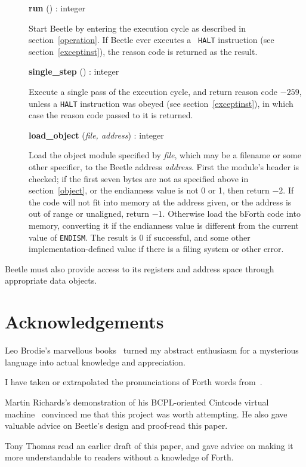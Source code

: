 \documentclass{article}
\newlength{\itemwidth}\itemwidth=\textwidth \advance\itemwidth by -0.1in
\newlength{\pronunc}\pronunc=1.7in
\newlength{\innerwidth}\innerwidth=\itemwidth \advance\innerwidth by -0.5in
\newcommand{\iface}[4]{\item[]\parbox{\itemwidth}{{\bf #1} ({\it #2}\/) :
#3\\[0.5ex]\hspace*{0.4in}\parbox{\innerwidth}{#4}}}
\begin{document}
\begin{description}
\iface{run}{}{integer}{Start Beetle by entering the execution cycle as
    described in section~\ref{operation}. If Beetle ever executes a {\tt
    HALT} instruction (see section~\ref{exceptinst}), the reason code is
    returned as the result.}
\iface{single\_step}{}{integer}{Execute a single pass of the execution
    cycle, and return reason code $-259$, unless a {\tt HALT} instruction was
    obeyed (see section~\ref{exceptinst}), in which case the reason code
    passed to it is returned.}
\iface{load\_object}{file, address}{integer}{Load the object module
    specified by \textit{file}, which may be a filename or some other
    specifier, to the Beetle address \textit{address}. First the module's
    header is checked; if the first seven bytes are not as specified above
    in section~\ref{object}, or the endianness value is not 0 or 1, then
    return $-2$. If the code will not fit into memory at the address given, or
    the address is out of range or unaligned, return $-1$. Otherwise load the bForth code into
    memory, converting it if the endianness value is different from the current
    value of {\tt ENDISM}. The result is 0 if successful, and some other
    implementation-defined value if there is a filing system or other error.}
\end{description}

Beetle must also provide access to its registers and address space through
appropriate data objects.


\section*{Acknowledgements}

Leo Brodie's marvellous books~\cite{starting4th,thinking4th} turned my abstract
enthusiasm for a mysterious language into actual knowledge and appreciation.

I have taken or extrapolated the pronunciations of Forth words from~\cite{ANSIforth}.

Martin Richards's demonstration of his BCPL-oriented Cintcode virtual machine~\cite{cintweb}
convinced me that this project was worth attempting. He also gave valuable
advice on Beetle's design and proof-read this paper.

Tony Thomas read an earlier draft of this paper, and gave advice on making it
more understandable to readers without a knowledge of Forth.




\end{document}
